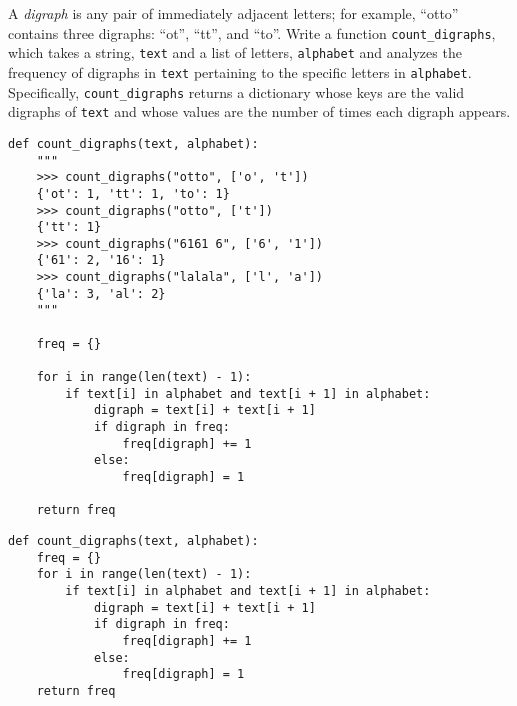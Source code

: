 \begin{blocksection}
\question A \textit{digraph} is any pair of immediately adjacent letters; for example, ``otto'' contains three digraphs: ``ot'', ``tt'', and ``to''. Write a function \lstinline{count_digraphs}, which takes a string, \lstinline{text} and a list of letters, \lstinline{alphabet} and analyzes the frequency of digraphs in \lstinline{text} pertaining to the specific letters in \lstinline{alphabet}. Specifically, \lstinline{count_digraphs} returns a dictionary whose keys are the valid digraphs of \lstinline{text} and whose values are the number of times each digraph appears.

\begin{lstlisting}
def count_digraphs(text, alphabet):
    """
    >>> count_digraphs("otto", ['o', 't'])
    {'ot': 1, 'tt': 1, 'to': 1}
    >>> count_digraphs("otto", ['t'])
    {'tt': 1}
    >>> count_digraphs("6161 6", ['6', '1'])
    {'61': 2, '16': 1}
    >>> count_digraphs("lalala", ['l', 'a'])
    {'la': 3, 'al': 2}
    """

    freq = {}

    for i in range(len(text) - 1):
        if text[i] in alphabet and text[i + 1] in alphabet:
            digraph = text[i] + text[i + 1]
            if digraph in freq:
                freq[digraph] += 1
            else:
                freq[digraph] = 1

    return freq
\end{lstlisting}
\end{blocksection}

\begin{solution}
\begin{lstlisting}
def count_digraphs(text, alphabet):
    freq = {}
    for i in range(len(text) - 1):
        if text[i] in alphabet and text[i + 1] in alphabet:
            digraph = text[i] + text[i + 1]
            if digraph in freq:
                freq[digraph] += 1
            else: 
                freq[digraph] = 1
    return freq
\end{lstlisting}
\end{solution}

